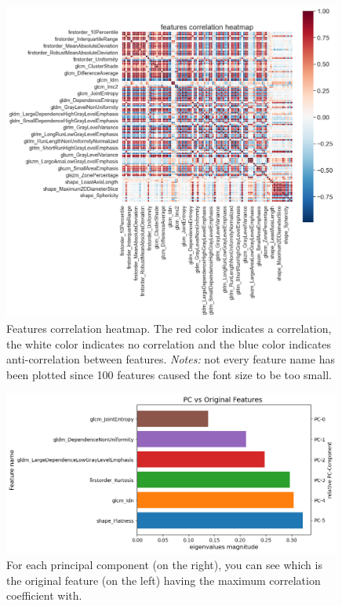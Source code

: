 \documentclass{standalone}
\begin{document}
\begin{figure}[htp]

    \centering
    \includegraphics[width=0.99\textwidth]{../images/heatmap.png}

    \caption{Features correlation heatmap. The red color indicates a correlation, the white color indicates no correlation and the blue color indicates anti-correlation between features. \textit{Notes:} not every feature name has been plotted since 100 features caused the font size to be too small.}
    \label{heatmap}
    
    \end{figure}

    \begin{figure}[ht]

    
        \includegraphics[width=0.99\textwidth]{../images/importance.png}
    
        \caption{For each principal component (on the right), you can see which is the original feature (on the left)  having the maximum correlation coefficient with.}
        \label{importance}
        
        \end{figure}
\end{document}
